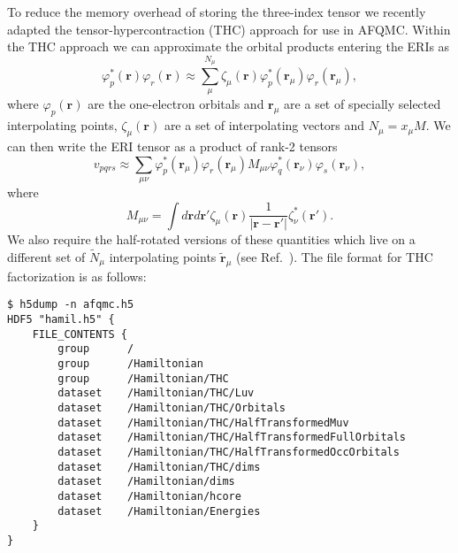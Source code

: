 To reduce the memory overhead of storing the three-index tensor we recently adapted the
tensor-hypercontraction\cite{HohensteinTHCI2012,ParrishTHCII2012,HohensteinTHCIII2012} (THC) approach for use in AFQMC\cite{MaloneISDF2019}. Within the THC approach we
can approximate the orbital products entering the ERIs as
\begin{equation}
    \varphi^{*}_p(\mathbf{r})\varphi_r(\mathbf{r}) \approx \sum_\mu^{N_\mu} \zeta_\mu(\mathbf{r}) \varphi^*_p(\mathbf{r}_\mu)\varphi_r(\mathbf{r}_\mu),\label{eq:orb_prod}
\end{equation}
where $\varphi_p(\mathbf{r})$ are the one-electron orbitals and $\mathbf{r}_\mu$ are a set of specially selected interpolating
points, $\zeta_\mu(\mathbf{r})$ are a set of interpolating vectors and $N_\mu = x_\mu M$. We can then write the ERI tensor as a
product of rank-2 tensors
\begin{equation}
    v_{pqrs} \approx \sum_{\mu\nu} \varphi^{*}_p(\mathbf{r}_\mu)\varphi_r(\mathbf{r}_\mu) M_{\mu\nu} \varphi^{*}_q(\mathbf{r}_\nu)\varphi_s(\mathbf{r}_\nu)\label{eq:4ix_thc},
\end{equation}
where
\begin{equation}
    M_{\mu\nu} = \int d\mathbf{r}d\mathbf{r}' \zeta_\mu(\mathbf{r})\frac{1}{|\mathbf{r}-\mathbf{r}'|}\zeta^{*}_\nu(\mathbf{r}')\label{eq:mmat}.
\end{equation}
We also require the half-rotated versions of these quantities which live on a different set of $\tilde{N}_\mu$ interpolating points $\tilde{\mathbf{r}}_\mu$ (see Ref.~\cite{MaloneISDF2019}).
The file format for THC factorization is as follows:
\begin{lstlisting}[style=SHELL,caption=Sample Sparse Cholesky QMCPACK Hamtiltonian.]
$ h5dump -n afqmc.h5
HDF5 "hamil.h5" {
    FILE_CONTENTS {
        group      /
        group      /Hamiltonian
        group      /Hamiltonian/THC
        dataset    /Hamiltonian/THC/Luv
        dataset    /Hamiltonian/THC/Orbitals
        dataset    /Hamiltonian/THC/HalfTransformedMuv
        dataset    /Hamiltonian/THC/HalfTransformedFullOrbitals
        dataset    /Hamiltonian/THC/HalfTransformedOccOrbitals
        dataset    /Hamiltonian/THC/dims
        dataset    /Hamiltonian/dims
        dataset    /Hamiltonian/hcore
        dataset    /Hamiltonian/Energies
    }
}
\end{lstlisting}
